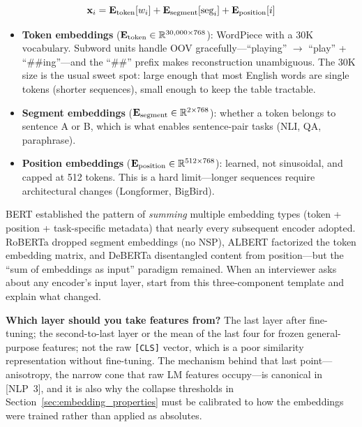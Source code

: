 \begin{equation}
\mathbf{x}_i = \mathbf{E}_{\text{token}}[w_i] + \mathbf{E}_{\text{segment}}[\text{seg}_i] + \mathbf{E}_{\text{position}}[i]
\end{equation}

\begin{itemize}
    \item \textbf{Token embeddings} ($\mathbf{E}_{\text{token}} \in \mathbb{R}^{30{,}000 \times 768}$): WordPiece with a 30K vocabulary. Subword units handle OOV gracefully---``playing'' $\to$ ``play'' + ``\#\#ing''---and the ``\#\#'' prefix makes reconstruction unambiguous. The 30K size is the usual sweet spot: large enough that most English words are single tokens (shorter sequences), small enough to keep the table tractable.
    \item \textbf{Segment embeddings} ($\mathbf{E}_{\text{segment}} \in \mathbb{R}^{2 \times 768}$): whether a token belongs to sentence A or B, which is what enables sentence-pair tasks (NLI, QA, paraphrase).
    \item \textbf{Position embeddings} ($\mathbf{E}_{\text{position}} \in \mathbb{R}^{512 \times 768}$): learned, not sinusoidal, and capped at 512 tokens. This is a hard limit---longer sequences require architectural changes (Longformer, BigBird).
\end{itemize}

\begin{keyinsight}
BERT established the pattern of \emph{summing} multiple embedding types (token + position + task-specific metadata) that nearly every subsequent encoder adopted. RoBERTa dropped segment embeddings (no NSP), ALBERT factorized the token embedding matrix, and DeBERTa disentangled content from position---but the ``sum of embeddings as input'' paradigm remained. When an interviewer asks about any encoder's input layer, start from this three-component template and explain what changed.
\end{keyinsight}

\textbf{Which layer should you take features from?} The last layer after fine-tuning; the second-to-last layer or the mean of the last four for frozen general-purpose features; not the raw \texttt{[CLS]} vector, which is a poor similarity representation without fine-tuning. The mechanism behind that last point---anisotropy, the narrow cone that raw LM features occupy---is canonical in [NLP~3], and it is also why the collapse thresholds in Section~\ref{sec:embedding_properties} must be calibrated to how the embeddings were trained rather than applied as absolutes.

